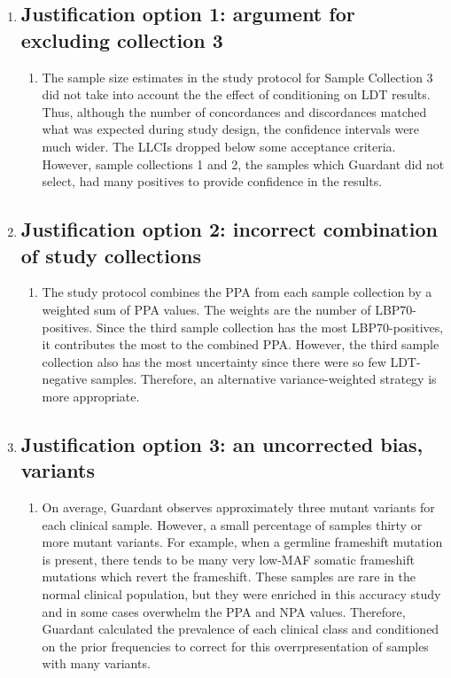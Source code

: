 \begin{enumerate}
	\item \subsection{Justification option 1: argument for excluding collection 3}
	\begin{enumerate}
	\item The sample size estimates in the study protocol for Sample Collection 3 did not take into account the 
	the effect of conditioning on LDT results. Thus, although the number of concordances and
	discordances matched what was expected during study design, the confidence intervals were much
	wider. The LLCIs dropped below some acceptance criteria.
	However, sample collections 1 and 2, the samples which Guardant did not select, had
	many positives to provide confidence in the results.
	\end{enumerate}
	
	\item \subsection{Justification option 2: incorrect combination of study collections}
	\begin{enumerate}
	\item The study protocol combines the PPA from each sample collection by a weighted sum
	of PPA values. The weights are the number of LBP70-positives. Since the third sample collection
	has the most LBP70-positives, it contributes the most to the combined PPA. However, the third
	sample collection also has the most uncertainty since there were so few LDT-negative
	samples. Therefore, an alternative variance-weighted strategy is more appropriate.
	\end{enumerate}
	
	\item \subsection{Justification option 3: an uncorrected bias, variants}
	\begin{enumerate}
	    \item On average, Guardant observes approximately three mutant variants for
	    each clinical sample. However, a small percentage of samples thirty or more
	    mutant variants. For example, when a germline
	    frameshift mutation is present, there tends to be many very low-MAF somatic 
	    frameshift mutations which revert the frameshift. These samples are rare
	    in the normal clinical population, but they were enriched in this accuracy
	    study and in some cases overwhelm the PPA and NPA values. Therefore, Guardant
	    calculated the prevalence of each clinical class and conditioned on the prior
	    frequencies to correct for this overrpresentation of samples with many variants.
	\end{enumerate}
	

\end{enumerate}
